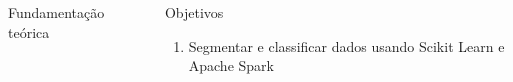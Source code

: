 \documentclass[final,hyperref={pdfpagelabels=false, brazil}]{beamer}
\let\olditem=\item%
\renewcommand{\item}{\olditem \justifying}%
\begin{document}
\begin{frame}[t]
\begin{columns}[t]
\begin{column}{.465\textwidth}
\begin{block}{Fundamenta\c c\~ao te\'orica}
\begin{itemize}
\begin{itemize}
\end{itemize}

\end{itemize}

\end{block}


\end{column} %

\begin{column}{.01\textwidth}\end{column} %
 
\begin{column}{.465\textwidth} %


\begin{block}{Objetivos}

\begin{enumerate}
\item Segmentar e classificar dados usando Scikit Learn\cite{SCI} e Apache Spark\cite{SPARK} 

\end{enumerate}


\end{block}




\end{column}
\end{columns}
\end{frame}
\end{document}
